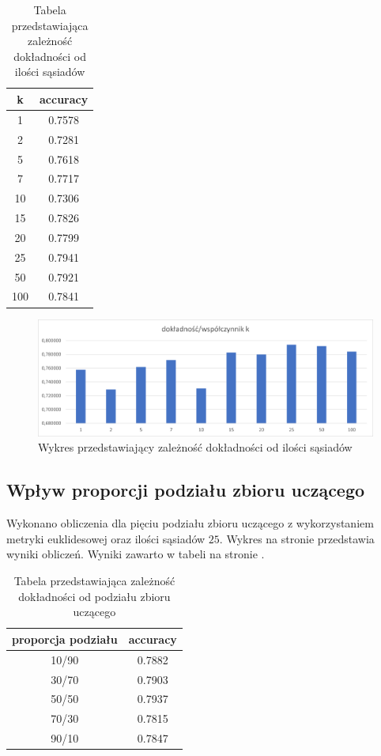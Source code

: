 \documentclass{classrep}
\begin{document}
\begin{table}
\label{tk}
\begin{tabular}{|c|c|}
\hline k & accuracy \\
\hline \hline
1& 0.7578\\
2& 0.7281\\
5& 0.7618\\
7& 0.7717\\
10& 0.7306\\
15& 0.7826\\
20& 0.7799\\
25& 0.7941\\
50& 0.7921\\
100& 0.7841\\
\end{tabular}
\caption{Tabela przedstawiająca zależność dokładności od ilości sąsiadów}
\end{table}

\begin{figure}
\label{accuracy_k}
\includegraphics[scale=0.75]{accuracy_k}
\caption{Wykres przedstawiający zależność dokładności od ilości sąsiadów}
\end{figure}



\subsection{Wpływ proporcji podziału zbioru uczącego}
Wykonano obliczenia dla pięciu podziału zbioru uczącego z wykorzystaniem metryki euklidesowej oraz ilości sąsiadów $25$. Wykres na stronie \pageref{accuracy_div} przedstawia wyniki obliczeń. Wyniki zawarto w tabeli na stronie \pageref{tdiv}.

\begin{table}
\label{tdiv}
\begin{tabular}{|c|c|}
\hline proporcja podziału & accuracy \\
\hline \hline
10/90& 0.7882\\
30/70& 0.7903\\
50/50& 0.7937\\
70/30& 0.7815\\
90/10& 0.7847\\
\end{tabular}
\caption{Tabela przedstawiająca zależność dokładności od podziału zbioru uczącego}
\end{table}
\end{document}
